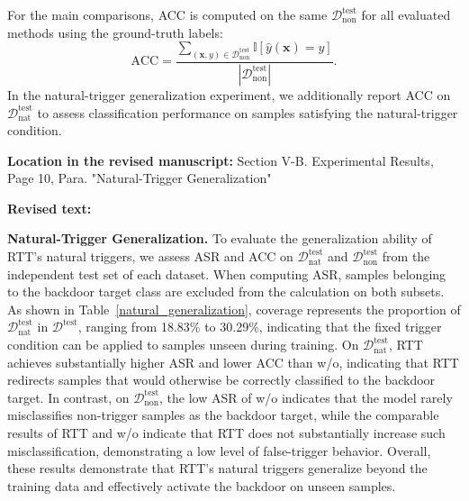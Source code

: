 \documentclass[11pt,a4paper]{article}
\newcommand{\manualindent}{\par\noindent\hspace*{1.5em}\ignorespaces}
\newcommand{\revisedtext}[2]{%
  {\bfseries\color{headingnavy}Location in the revised manuscript:} #1\par
  \begin{tcolorbox}[
      enhanced,breakable,colback=replyblue!3,colframe=replyblue!18,
      before upper={\setlength{\parskip}{6pt}},
      borderline west={2.5pt}{0pt}{replyblue},
      boxrule=0.5pt,arc=1mm,left=11pt,right=9pt,top=8pt,bottom=8pt]
    {\bfseries\color{headingnavy}Revised text:}\par
    #2
  \end{tcolorbox}
  \vspace{0.35em}%
}
\begin{document}
{\manualindent For the main comparisons, ACC is computed on the same $\mathcal{D}_{\mathrm{non}}^{\mathrm{test}}$ for all evaluated methods using the ground-truth labels:
\begin{equation}
\mathrm{ACC}
=
\frac{
\sum_{(\mathbf{x},y)\in\mathcal{D}_{\mathrm{non}}^{\mathrm{test}}}
\mathbb{I}[\hat{y}(\mathbf{x})=y]
}{
|\mathcal{D}_{\mathrm{non}}^{\mathrm{test}}|
}.
\tag{21}
\end{equation}
In the natural-trigger generalization experiment, we additionally report ACC on $\mathcal{D}_{\mathrm{nat}}^{\mathrm{test}}$ to assess classification performance on samples satisfying the natural-trigger condition.}

\revisedtext{Section V-B. Experimental Results, Page 10, Para. "Natural-Trigger Generalization"}
{\manualindent \textbf{Natural-Trigger Generalization.}
To evaluate the generalization ability of RTT's natural triggers, we assess ASR and ACC on $\mathcal{D}_{\mathrm{nat}}^{\mathrm{test}}$ and $\mathcal{D}_{\mathrm{non}}^{\mathrm{test}}$ from the independent test set of each dataset.
When computing ASR, samples belonging to the backdoor target class are excluded from the calculation on both subsets.
As shown in Table~\ref{natural_generalization}, coverage represents the proportion of $\mathcal{D}_{\mathrm{nat}}^{\mathrm{test}}$ in $\mathcal{D}^{\mathrm{test}}$, ranging from 18.83\% to 30.29\%, indicating that the fixed trigger condition can be applied to samples unseen during training.
On $\mathcal{D}_{\mathrm{nat}}^{\mathrm{test}}$, RTT achieves substantially higher ASR and lower ACC than w/o, indicating that RTT redirects samples that would otherwise be correctly classified to the backdoor target.
In contrast, on $\mathcal{D}_{\mathrm{non}}^{\mathrm{test}}$, the low ASR of w/o indicates that the model rarely misclassifies non-trigger samples as the backdoor target, while the comparable results of RTT and w/o indicate that RTT does not substantially increase such misclassification, demonstrating a low level of false-trigger behavior.
Overall, these results demonstrate that RTT's natural triggers generalize beyond the training data and effectively activate the backdoor on unseen samples.

}
\end{document}
